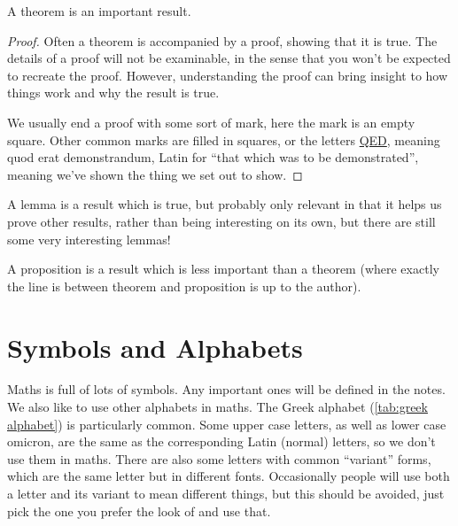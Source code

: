 \documentclass[fleqn]{LectureClass/LectureClass}
\begin{document}
    \begin{thm}{}{}
        A theorem is an important result.
        \begin{proof}
            Often a theorem is accompanied by a proof, showing that it is true.
            The details of a proof will not be examinable, in the sense that you won't be expected to recreate the proof.
            However, understanding the proof can bring insight to how things work and why the result is true.
            
            We usually end a proof with some sort of mark, here the mark is an empty square.
            Other common marks are filled in squares, or the letters \href{https://en.wikipedia.org/wiki/Q.E.D.}{QED}, meaning quod erat demonstrandum, Latin for \enquote{that which was to be demonstrated}, meaning we've shown the thing we set out to show.
        \end{proof}
    \end{thm}
    
    \begin{lma}{}{}
        A lemma is a result which is true, but probably only relevant in that it helps us prove other results, rather than being interesting on its own, but there are still some very interesting lemmas!
    \end{lma}
    
    \begin{prp}{}{}
        A proposition is a result which is less important than a theorem (where exactly the line is between theorem and proposition is up to the author).
    \end{prp}
    
    \section{Symbols and Alphabets}
    Maths is full of lots of symbols.
    Any important ones will be defined in the notes.
    We also like to use other alphabets in maths.
    The Greek alphabet (\cref{tab:greek alphabet}) is particularly common.
    Some upper case letters, as well as lower case omicron, are the same as the corresponding Latin (normal) letters, so we don't use them in maths.
    There are also some letters with common \enquote{variant} forms, which are the same letter but in different fonts.
    Occasionally people will use both a letter and its variant to mean different things, but this should be avoided, just pick the one you prefer the look of and use that.
    
\end{document}
